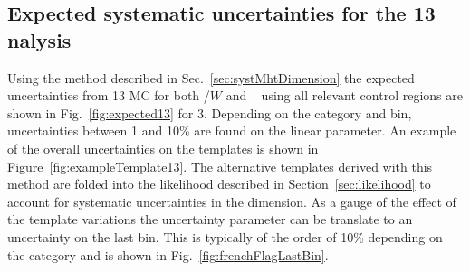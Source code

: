 \subsection{Expected systematic uncertainties for the 13 \texorpdfstring{\TeV} analysis}
\label{sec:syst13TeV}
Using the method described in Sec.~\ref{sec:systMhtDimension} the expected uncertainties
from 13 \TeV MC for both \ttbar/$W$  and \zInv~ using all relevant control regions are
shown in Fig.~\ref{fig:expected13} for 3\ifb. 
Depending on the category and \scalht bin, uncertainties between 1 and 10\% are found
on the linear parameter.
An example of the overall uncertainties on the \mht templates is shown
in Figure~\ref{fig:exampleTemplate13}.
The alternative templates derived with this method are folded into the 
likelihood described in Section~\ref{sec:likelihood} to account for
systematic uncertainties in the \mht dimension.
As a gauge of the effect of the template variations the uncertainty parameter 
can be translate to an uncertainty on the last bin. This is typically
of the order of 10\% depending on the category and is shown
in Fig.~\ref{fig:frenchFlagLastBin}.


